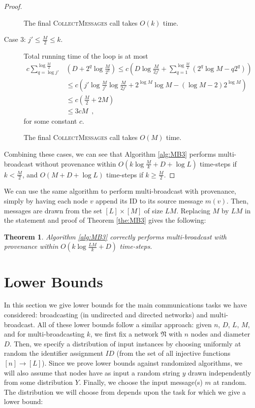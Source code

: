 \documentclass{article}
\newtheorem{theorem}{Theorem}
\newcommand{\net}{\ensuremath{\mathfrak{N}}\xspace}
\newcommand{\cj}{\ensuremath{c}\xspace}
\begin{document}
\begin{proof}
\begin{description}
		The final \textsc{CollectMessages} call takes $O(k)$ time.
		
		\item[Case 3: $j'\leq \frac M2\leq k$.]
		
		Total running time of the loop is at most
		\begin{align*}
		\cj\sum\limits_{q=\log j'}^{\log \frac M2}&\left(D+2^q\log \frac {M}{2^q}\right)
		\leq \cj(D\log\frac{M}{2j'} +\sum\limits_{q=1}^{\log \frac M2}(2^q\log M-q2^q))\\
		&\leq \cj(j'\log \frac {M}{j'}\log\frac{M}{2j'} + 2^{\log M}\log M - (\log M -2) 2^{\log M})\\
		&\leq \cj(\frac M2 + 2M)\\
		&\leq 3\cj M\enspace,
		\end{align*}
		for some constant $\cj$.
		
		The final \textsc{CollectMessages} call takes $O(M)$ time.
		
	\end{description}
	
	Combining these cases, we can see that Algorithm \ref{alg:MB3} performs multi-broadcast without provenance within $O(k \log \frac{M}{k} + D+\log L)$ time-steps if $k<\frac M2$, and $O(M + D+\log L)$ time-steps if $k \ge \frac M2$.
\end{proof}

We can use the same algorithm to perform multi-broadcast with provenance, simply by having each node $v$ append its ID to its source message $m(v)$. Then, messages are drawn from the set $[L]\times[M]$ of size $LM$. Replacing $M$ by $LM$ in the statement and proof of Theorem \ref{the:MB3} gives the following:

\begin{theorem}\label{the:MB4}
	Algorithm \ref{alg:MB3} correctly performs multi-broadcast with provenance within $O(k \log \frac{LM}{k} + D)$ time-steps. \qedhere
\end{theorem}
\section{Lower Bounds}

In this section we give lower bounds for the main communications tasks we have considered: broadcasting (in undirected and directed networks) and multi-broadcast. All of these lower bounds follow a similar approach: given $n$, $D$, $L$, $M$, and for multi-broadcasting $k$, we first fix a network $\net$ with $n$ nodes and diameter $D$. Then, we specify a distribution of input instances by choosing uniformly at random the identifier assignment $ID$ (from the set of all injective functions $[n]\rightarrow [L]$). Since we prove lower bounds against randomized algorithms, we will also assume that nodes have as input a random string $y$ drawn independently from some distribution $Y$. Finally, we choose the input message(s) $m$ at random. The distribution we will choose from depends upon the task for which we give a lower bound: 
\end{document}
